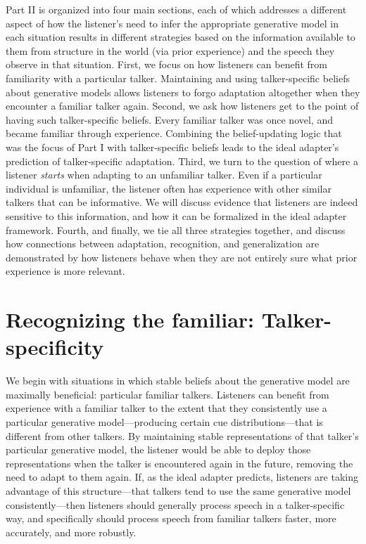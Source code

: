 Part II is organized into four main sections, each of which addresses a different aspect of how the listener's need to infer the appropriate generative model in each situation results in different strategies based on the information available to them from structure in the world (via prior experience) and the speech they observe in that situation.  First, we focus on how listeners can benefit from familiarity with a particular talker.  Maintaining and using talker-specific beliefs about generative models allows listeners to forgo adaptation altogether when they encounter a familiar talker again.  Second, we ask how listeners get to the point of having such talker-specific beliefs.  Every familiar talker was once novel, and became familiar through experience.  Combining the belief-updating logic that was the focus of Part I with talker-specific beliefs leads to the ideal adapter's prediction of talker-specific adaptation.  Third, we turn to the question of where a listener \emph{starts} when adapting to an unfamiliar talker.  Even if a particular individual is unfamiliar, the listener often has experience with other similar talkers that can be informative.  We will discuss evidence that listeners are indeed sensitive to this information, and how it can be formalized in the ideal adapter framework.  Fourth, and finally, we tie all three strategies together, and discuss how connections between adaptation, recognition, and generalization are demonstrated by how listeners behave when they are not entirely sure what prior experience is more relevant.  


\section{Recognizing the familiar: Talker-specificity}
\label{sec:recogn-famil-talk}


We begin with situations in which stable beliefs about the generative model are maximally beneficial: particular familiar talkers.  Listeners can benefit from experience with a familiar talker to the extent that they consistently use a particular generative model---producing certain cue distributions---that is different from other talkers.  By maintaining stable representations of that talker's particular generative model, the listener would be able to deploy those representations when the talker is encountered again in the future, removing the need to adapt to them again.  If, as the ideal adapter predicts, listeners are taking advantage of this structure---that talkers tend to use the same generative model consistently---then listeners should generally process speech in a talker-specific way, and specifically should process speech from familiar talkers faster, more accurately, and more robustly.

